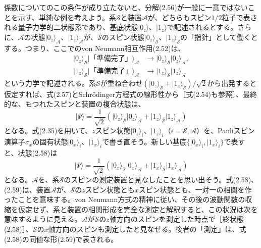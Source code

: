 \hypertarget{srcpage:54}{}\label{srcpage:54}
係数についてのこの条件が成り立たないと、分解(2.56)が一般に一意ではないことを示す、単純な例を考えよう。系$\mathcal S$と装置$\mathcal A$が、どちらもスピン$1/2$粒子で表される量子力学的二状態系であり、基底状態$\lvert0_z\rangle$、$\lvert1_z\rangle$で記述されるとする。さらに、$\mathcal A$の状態$\lvert0_z\rangle_{\mathcal A}$、$\lvert1_z\rangle_{\mathcal A}$が、$\mathcal S$のスピン状態$\lvert0_z\rangle_{\mathcal S}$、$\lvert1_z\rangle_{\mathcal S}$の「指針」として働くとする。つまり、ここでのvon Neumann相互作用(2.52)は、
\begin{equation}\begin{split}\lvert0_z\rangle_{\mathcal S}\lvert\text{「準備完了」}\rangle_{\mathcal A}&\longrightarrow\lvert0_z\rangle_{\mathcal S}\lvert0_z\rangle_{\mathcal A},\\\lvert1_z\rangle_{\mathcal S}\lvert\text{「準備完了」}\rangle_{\mathcal A}&\longrightarrow\lvert1_z\rangle_{\mathcal S}\lvert1_z\rangle_{\mathcal A}\end{split}\tag{2.57}\end{equation}
という力学で記述される。系$\mathcal S$が重ね合わせ$(\lvert0_z\rangle_{\mathcal S}+\lvert1_z\rangle_{\mathcal S})/\sqrt2$から出発すると仮定すれば、式(2.57)とSchrödinger方程式の線形性から［式(2.54)も参照］、最終的な、もつれたスピンと装置の複合状態は、
\begin{equation}\lvert\Psi\rangle=\frac1{\sqrt2}(\lvert0_z\rangle_{\mathcal S}\lvert0_z\rangle_{\mathcal A}+\lvert1_z\rangle_{\mathcal S}\lvert1_z\rangle_{\mathcal A})\tag{2.58}\end{equation}
となる。式(2.35)を用いて、$z$スピン状態$\lvert0_z\rangle_i$、$\lvert1_z\rangle_i$（$i=\mathcal S,\mathcal A$）を、Pauliスピン演算子$\hat\sigma_x$の固有状態$\lvert0_x\rangle_i$、$\lvert1_x\rangle_i$で書き直そう。新しい基底$\{\lvert0_x\rangle_i,\lvert1_x\rangle_i\}$で表すと、状態(2.58)は
\begin{equation}\lvert\Psi\rangle=\frac1{\sqrt2}(\lvert0_x\rangle_{\mathcal S}\lvert0_x\rangle_{\mathcal A}+\lvert1_x\rangle_{\mathcal S}\lvert1_x\rangle_{\mathcal A})\tag{2.59}\end{equation}
となる。$\mathcal A$を、系$\mathcal S$のスピンの測定装置と見なしたことを思い出そう。式(2.58)、(2.59)は、装置$\mathcal A$が、$\mathcal S$の$z$スピン状態とも$x$スピン状態とも、一対一の相関を作ったことを意味する。von Neumann方式の精神に従い、その後の波動関数の収縮を仮定せず、系と装置の相関形成を完全な測定と解釈すると、この状況は次を意味するように見える。$\mathcal A$が$\mathcal S$の$z$軸方向のスピンを測定した時点で［終状態(2.58)］、$\mathcal S$の$x$軸方向のスピンも測定したと見なせる。後者の「測定」は、式(2.58)の同値な形(2.59)で表される。

